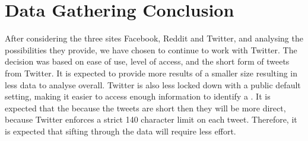 \section{Data Gathering Conclusion}\label{sec:social-media-conclusion}
After considering the three sites Facebook, Reddit and Twitter, and
analysing the possibilities they provide, we have chosen to continue to work
with Twitter. The decision was based on ease of use, level of access, and the
short form of tweets from Twitter. It is expected to provide more results of a
smaller size resulting in less data to analyse overall. Twitter is also less
locked down with a public default setting, making it easier to access enough
information to identify a \fb. It is expected that the because the tweets are
short then they will be more direct, because Twitter enforces a strict 140
character limit on each tweet. Therefore, it is expected that sifting through
the data will require less effort.\nl
% 

